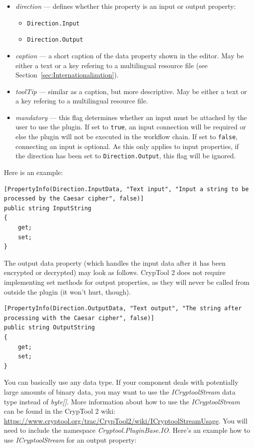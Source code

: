 \begin{itemize}
	\item \textit{direction} --- defines whether this property is an input or output property:
	\begin{itemize}
		\item \texttt{Direction.Input}
		\item \texttt{Direction.Output}
	\end{itemize}
	\item \textit{caption} --- a short caption of the data property shown in the editor. May be either a text or a key refering to a multilingual resource file (see Section~\ref{sec:Internationalization}).
	\item \textit{toolTip} --- similar as a caption, but more descriptive. May be either a text or a key refering to a multilingual resource file.
	\item \textit{mandatory} --- this flag determines whether an input must be attached by the user to use the plugin. If set to \texttt{true}, an input connection will be required or else the plugin will not be executed in the workflow chain. If set to \texttt{false}, connecting an input is optional. As this only applies to input properties, if the direction has been set to \texttt{Direction.Output}, this flag will be ignored.

\end{itemize}

Here is an example:
\clearpage

\begin{lstlisting}
[PropertyInfo(Direction.InputData, "Text input", "Input a string to be processed by the Caesar cipher", false)]
public string InputString
{
	get;
	set;
}
\end{lstlisting}

The output data property (which handles the input data after it has been encrypted or decrypted) may look as follows. CrypTool 2 does not require implementing set methods for output properties, as they will never be called from outside the plugin (it won't hurt, though).

\begin{lstlisting}
[PropertyInfo(Direction.OutputData, "Text output", "The string after processing with the Caesar cipher", false)]
public string OutputString
{
	get;
	set;
}
\end{lstlisting}

You can basically use any data type. If your component deals with potentially large amounts of binary data, you may want to use the \textit{ICryptoolStream} data type instead of \textit{byte[]}. More information about how to use the \textit{ICryptoolStream} can be found in the CrypTool 2 wiki: \url{https://www.cryptool.org/trac/CrypTool2/wiki/ICryptoolStreamUsage}. You will need to include the namespace \textit{Cryptool.PluginBase.IO}. Here's an example how to use \textit{ICryptoolStream} for an output property:

